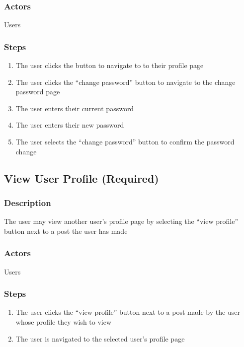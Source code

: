 \documentclass[12pt]{scrartcl}
\begin{document}
\subsubsection{Actors}

Users

\subsubsection{Steps}

\begin{enumerate}
\item The user clicks the button to navigate to to their profile page
\item The user clicks the “change password” button to navigate to the change password page
\item The user enters their current password
\item The user enters their new password
\item The user selects the “change password” button to confirm the password change
\end{enumerate}

\subsection{View User Profile (Required)}
\subsubsection{Description}

The user may view another user’s profile page by selecting the “view profile” button next to a post the user has made

\subsubsection{Actors}

Users

\subsubsection{Steps}

\begin{enumerate}
\item The user clicks the “view profile” button next to a post made by the user whose profile they wish to view
\item The user is navigated to the selected user’s profile page
\end{enumerate}
\end{document}
